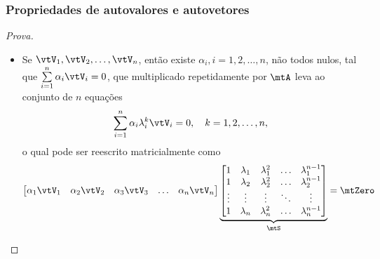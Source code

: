 \begin{frame}
  \frametitle{Propriedades de autovalores e autovetores}
  \vspace{-0.5\baselineskip}
  \begin{proof}[Prova]
    \begin{itemize}
      \item  Se $\vtV_1, \vtV_2, \ldots, \vtV_n$, então existe $\alpha_i, i = 1, 2, \ldots, n$, não todos nulos, tal que $\sum\limits_{i=1}^n \alpha_i \vtV_i = 0$, que multiplicado repetidamente por $\mtA$ leva ao conjunto de $n$ equações
      \begin{equation}\label{eq_li_autovect2}
        \sum\limits_{i=1}^n \alpha_i \lambda^k_i\vtV_i = 0, \quad k = 1, 2, \ldots, n,
      \end{equation}
      o qual pode ser reescrito matricialmente como
      \begin{equation}\label{eq_li_autovect3}
        \begin{bmatrix}
          \alpha_1 \vtV_1 & \alpha_2 \vtV_2 & \alpha_3 \vtV_3 & \ldots & \alpha_n \vtV_n
        \end{bmatrix}
        \underbrace{\begin{bmatrix}
          1 & \lambda_1 & \lambda^2_1 & \ldots & \lambda^{n-1}_1 \\
          1 & \lambda_2 & \lambda^2_2 & \ldots & \lambda^{n-1}_2 \\
          \vdots & \vdots & \vdots & \ddots & \vdots \\
          1 & \lambda_n & \lambda^2_n & \ldots & \lambda^{n-1}_n
        \end{bmatrix}}_{\mtS} = \mtZero
      \end{equation}
    \end{itemize}
  \end{proof}
\end{frame}

